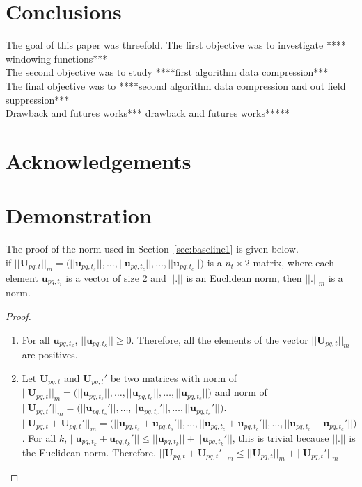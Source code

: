 \documentclass[useAMS,usenatbib]{mn2e}
\begin{document}
\section{Conclusions}
The goal of this paper was threefold. The first objective was to investigate **** windowing functions***\\
The second objective  was to study ****first algorithm data compression***\\
The final objective was to ****second algorithm data compression and out field suppression*** \\
Drawback and futures works*** drawback and futures works*****

\section*{Acknowledgements}


\appendix
\section[]{Demonstration}
\label{sec:demonorm}
The proof of the norm used in Section~\ref{sec:baseline1} is given below.\\
if $||\textbf{U}_{pq,t}||_{m}=\Bigg(||\mathbf{u}_{pq,t_s}||, \dots , ||\mathbf{u}_{pq,t_c}||, \dots, ||\mathbf{u}_{pq,t_e}||\Bigg)$ is a 
$n_t\times2$ matrix, where each element $\mathbf{u}_{pq,t_i}$ is a vector of size 2 and $||.||$ is an Euclidean norm, then $||.||_{m}$ 
is a norm.
\begin{proof}
\begin{enumerate}
 \item  For all $\mathbf{u}_{pq,t_k}$, $||\mathbf{u}_{pq,t_k}||\geq 0$. Therefore, all the elements of the vector
    $||\mathbf{U}_{pq,t}||_{m}$ are positives.
 \item Let $\mathbf{U}_{pq,t}$ and $\mathbf{U}_{pq,t}'$ be two 
matrices with norm of $||\textbf{U}_{pq,t}||_{m}=\Bigg(||\mathbf{u}_{pq,t_s}||, \dots , ||\mathbf{u}_{pq,t_c}||, \dots, 
||\mathbf{u}_{pq,t_e}||\Bigg)$ and norm of $||\textbf{U}_{pq,t}'||_{m}=\Bigg(||\mathbf{u}_{pq,t_s}'||, \dots , ||\mathbf{u}_{pq,t_c}'||, 
\dots, ||\mathbf{u}_{pq,t_e}'||\Bigg)$. 
$||\mathbf{U}_{pq,t}+\mathbf{U}_{pq,t}'||_{m}=\Bigg(||\mathbf{u}_{pq,t_s}+\mathbf{u}_{pq,t_s}'||, \dots , 
||\mathbf{u}_{pq,t_c}+\mathbf{u}_{pq,t_c}'||, \dots, ||\mathbf{u}_{pq,t_e}+\mathbf{u}_{pq,t_e}'||\Bigg)$.  For all $k$, 
$||\mathbf{u}_{pq,t_k}+\mathbf{u}_{pq,t_k}'||\leq ||\mathbf{u}_{pq,t_k}||+||\mathbf{u}_{pq,t_k}'||$, this is trivial because $||.||$ is the 
Euclidean norm. Therefore,
$||\mathbf{U}_{pq,t}+\mathbf{U}_{pq,t}'||_{m} \leq ||\mathbf{U}_{pq,t}||_{m} + ||\mathbf{U}_{pq,t}'||_{m}$
\end{enumerate}
\end{proof}
\end{document}
